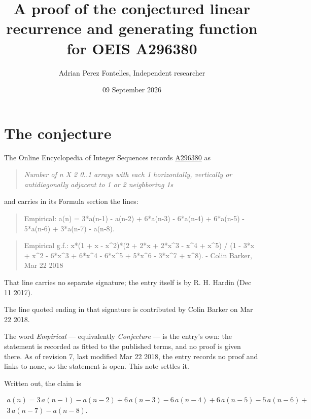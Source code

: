 \documentclass[11pt]{article}
\title{A proof of the conjectured linear recurrence and generating function for OEIS A296380}
\author{Adrian Perez Fontelles, Independent researcher}
\date{09 September 2026}
\theoremstyle{definition}
\begin{document}
\maketitle
\section{The conjecture}

The Online Encyclopedia of Integer Sequences records \href{https://oeis.org/A296380}{A296380} as

\begin{quote}\itshape Number of n X 2 0..1 arrays with each 1 horizontally, vertically or antidiagonally adjacent to 1 or 2 neighboring 1s\end{quote}

and carries in its Formula section the lines:

\begin{quote}\ttfamily Empirical: a(n) = 3*a(n-1) - a(n-2) + 6*a(n-3) - 6*a(n-4) + 6*a(n-5) - 5*a(n-6) + 3*a(n-7) - a(n-8).\end{quote}

\begin{quote}\ttfamily Empirical g.f.: x*(1 + x - x\textasciicircum{}2)*(2 + 2*x + 2*x\textasciicircum{}3 - x\textasciicircum{}4 + x\textasciicircum{}5) / (1 - 3*x + x\textasciicircum{}2 - 6*x\textasciicircum{}3 + 6*x\textasciicircum{}4 - 6*x\textasciicircum{}5 + 5*x\textasciicircum{}6 - 3*x\textasciicircum{}7 + x\textasciicircum{}8). - Colin Barker, Mar 22 2018\end{quote}

That line carries no separate signature; the entry itself is by R. H. Hardin (Dec 11 2017).

The line quoted ending in that signature is contributed by Colin Barker on Mar 22 2018.

The word {\itshape Empirical} --- equivalently {\itshape Conjecture} --- is the entry's own: the statement is recorded as fitted to the published terms, and no proof is given there. As of revision 7, last modified Mar 22 2018, the entry records no proof and links to none, so the statement is open. This note settles it.

Written out, the claim is

\begin{multline*} a(n) = 3\,a(n-1) - a(n-2) + 6\,a(n-3) - 6\,a(n-4) + 6\,a(n-5) - 5\,a(n-6) + \\ 3\,a(n-7) - a(n-8). \end{multline*}
\end{document}
